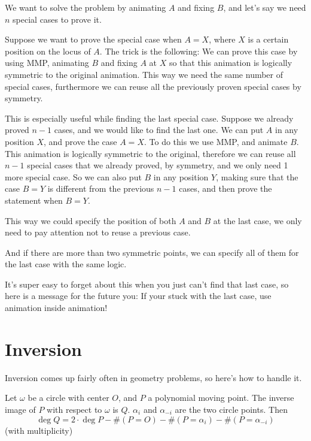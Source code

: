 \documentclass[a4paper]{article}
\begin{document}
We want to solve the problem by animating $A$ and fixing $B$, and let's say we need $n$ special cases to prove it.

Suppose we want to prove the special case when $A=X$, where $X$ is a certain position on the locus of $A$. The trick is the following: We can prove this case by using MMP, animating $B$ and fixing $A$ at $X$ so that this animation is logically symmetric to the original animation. This way we need the same number of special cases, furthermore we can reuse all the previously proven special cases by symmetry.

This is especially useful while finding the last special case. Suppose we already proved $n-1$ cases, and we would like to find the last one. We can put $A$ in any position $X$, and prove the case $A=X$. To do this we use MMP, and animate $B$. This animation is logically symmetric to the original, therefore we can reuse all $n-1$ special cases that we already proved, by symmetry, and we only need 1 more special case. So we can also put $B$ in any position $Y$, making sure that the case $B=Y$ is different from the previous $n-1$ cases, and then prove the statement when $B=Y$.

This way we could specify the position of both $A$ and $B$ at the last case, we only need to pay attention not to reuse a previous case.

And if there are more than two symmetric points, we can specify all of them for the last case with the same logic.

\begin{example}
        
\end{example}

It's super easy to forget about this when you just can't find that last case, so here is a message for the future you: If your stuck with the last case, use animation inside animation!

\section{Inversion}

Inversion comes up fairly often in geometry problems, so here's how to handle it.

\begin{theorem}
    Let $\omega$ be a circle with center $O$, and $P$ a polynomial moving point. The inverse image of $P$ with respect to $\omega$ is $Q$. $\alpha_i$ and $\alpha_{-i}$ are the two circle points. Then
    $$\deg Q=2\cdot \deg P - \#(P=O) - \#(P=\alpha_i) - \#(P=\alpha_{-i})$$ (with multiplicity)
\end{theorem}
\end{document}
